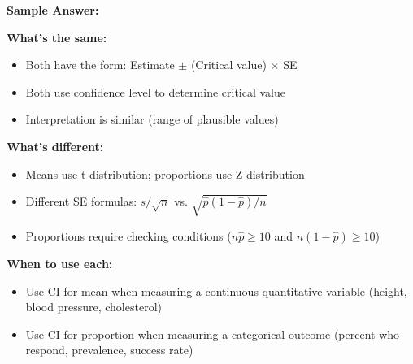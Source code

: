 \documentclass[11pt]{article}
\begin{document}
\textcolor{answergreen}{\textbf{Sample Answer:}}

\textbf{What's the same:}
\begin{itemize}
\item Both have the form: Estimate $\pm$ (Critical value) $\times$ SE
\item Both use confidence level to determine critical value
\item Interpretation is similar (range of plausible values)
\end{itemize}

\textbf{What's different:}
\begin{itemize}
\item Means use t-distribution; proportions use Z-distribution
\item Different SE formulas: $s/\sqrt{n}$ vs. $\sqrt{\hat{p}(1-\hat{p})/n}$
\item Proportions require checking conditions ($n\hat{p} \geq 10$ and $n(1-\hat{p}) \geq 10$)
\end{itemize}

\textbf{When to use each:}
\begin{itemize}
\item Use CI for mean when measuring a continuous quantitative variable (height, blood pressure, cholesterol)
\item Use CI for proportion when measuring a categorical outcome (percent who respond, prevalence, success rate)
\end{itemize}
\end{document}
